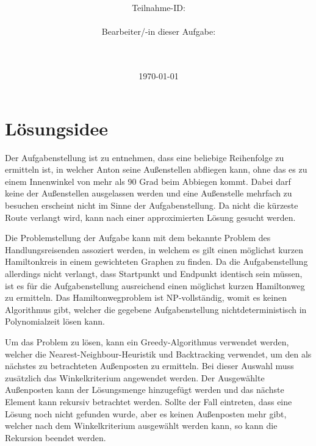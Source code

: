 \documentclass[a4paper,10pt,ngerman]{scrartcl}
\title{\textbf{\Huge\Aufgabe}}
\author{\LARGE Teilnahme-ID: \LARGE \TeilnahmeId \\\\
\LARGE Bearbeiter/-in dieser Aufgabe: \\
\LARGE \Name\\\\}
\date{\LARGE\today}
\begin{document}
    \maketitle
    \tableofcontents
    \vspace{0.5cm}
    \newpage


    \section{Lösungsidee}\label{sec:losungsidee}

    Der Aufgabenstellung ist zu entnehmen, dass eine beliebige Reihenfolge zu ermitteln ist,
    in welcher Anton seine Außenstellen abfliegen kann,
    ohne das es zu einem Innenwinkel von mehr als 90 Grad beim Abbiegen kommt.
    Dabei darf keine der Außenstellen ausgelassen werden
    und eine Außenstelle mehrfach zu besuchen erscheint nicht im Sinne der Aufgabenstellung.
    Da nicht die kürzeste Route verlangt wird, kann nach einer approximierten Lösung gesucht werden.

    Die Problemstellung der Aufgabe kann mit dem bekannte Problem des Handlungsreisenden assoziert werden,
    in welchem es gilt einen möglichst kurzen Hamiltonkreis in einem gewichteten Graphen zu finden.
    Da die Aufgabenstellung allerdings nicht verlangt, dass Startpunkt und Endpunkt identisch sein müssen,
    ist es für die Aufgabenstellung ausreichend einen möglichst kurzen Hamiltonweg zu ermitteln.
    Das Hamiltonwegproblem ist NP-vollständig, womit es keinen Algorithmus gibt,
    welcher die gegebene Aufgabenstellung nichtdeterministisch in Polynomialzeit lösen kann.

    Um das Problem zu lösen, kann ein Greedy-Algorithmus verwendet werden,
    welcher die Nearest-Neighbour-Heuristik und Backtracking verwendet,
    um den als nächstes zu betrachteten Außenposten zu ermitteln.
    Bei dieser Auswahl muss zusätzlich das Winkelkriterium angewendet werden.
    Der Ausgewählte Außenposten kann der Lösungsmenge hinzugefügt werden
    und das nächste Element kann rekursiv betrachtet werden.
    Sollte der Fall eintreten, dass eine Lösung noch nicht gefunden wurde, aber es keinen Außenposten mehr gibt,
    welcher nach dem Winkelkriterium ausgewählt werden kann, so kann die Rekursion beendet werden.
\end{document}
